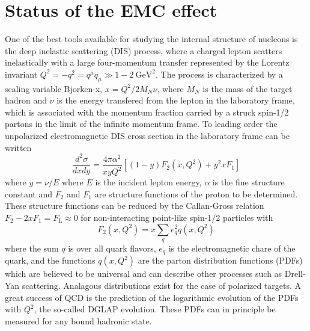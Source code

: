 \section{Status of the EMC effect}

One of the best tools available for studying the internal structure of nucleons is the deep inelastic
scattering (DIS) process, where a charged lepton scatters inelastically with a large four-momentum
transfer represented by the Lorentz invariant $Q^2 = -q^2 = q^\mu q_\mu \gg 1-2~\mathrm{GeV}^2$.
The process is characterized by a scaling variable Bjorken-x, $x = Q^2/2M_N \nu$, 
where $M_N$ is the mass of the target hadron and $\nu$ is the energy transfered from the lepton in the laboratory frame,
which is associated with the momentum fraction carried by a struck spin-1/2 partons in the limit of the infinite momentum frame.
To leading order the unpolarized electromagnetic DIS cross section in the laboratory frame can be written~\cite{PhysRevD.98.030001}
\begin{equation}
    \frac{d^2 \sigma}{dx dy} = \frac{4 \pi \alpha^2}{x y Q^2} \left[ (1-y)F_2(x, Q^2) + y^2 x F_1 \right]
\end{equation}
where $y = \nu/E$ where $E$ is the incident lepton energy, $\alpha$ is the fine structure constant and $F_2$
and $F_1$ are structure functions of the proton to be determined.  These structure functions can be reduced
by the Callan-Gross relation $F_2 - 2xF_1 = F_\mathrm{L} \approx 0$ for non-interacting point-like spin-1/2
particles with
\begin{equation}
    F_2(x,Q^2) = x \sum_{q} e_q^2 q(x,Q^2)
\end{equation}
where the sum $q$ is over all quark flavors,  $e_q$ is the electromagnetic chare of the quark, and the
functions $q(x,Q^2)$ are the parton distribution functions (PDFs) which are believed to be universal
and can describe other processes such as Drell-Yan scattering.  Analagous distributions exist for the case of polarized
targets.  A great success of QCD is the prediction of the logarithmic 
evolution of the PDFs with $Q^2$, the so-called DGLAP evolution.  These PDFs can in principle be measured for any bound hadronic state.

